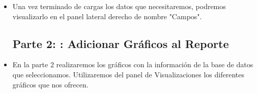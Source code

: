 \begin{itemize}
\begin{figure}[h]
	\begin{center}
	\end{center}
	\end{figure}
\clearpage
	\begin{figure}[h]
	\begin{center}
	\end{center}
	\end{figure}

	\item Una vez terminado de cargas los datos que necesitaremos, podremos visualizarlo en el panel lateral derecho de nombre "Campos".
	
     
\subsection{Parte 2: : Adicionar Gráficos al Reporte}
	\item En la parte 2 realizaremos los gráficos con la información de la base de datos que seleccionamos. Utilizaremos del panel de Visualizaciones los diferentes gráficos que nos ofrecen.


\end{itemize}
